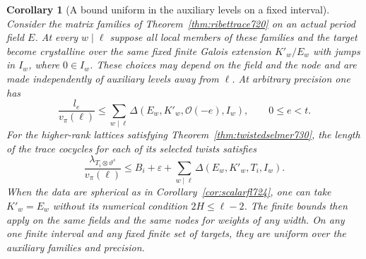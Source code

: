 \documentclass[a4paper,11pt]{article}
\newtheorem{corollary}[proposition]{Corollary}
\theoremstyle{definition}
\theoremstyle{remark}
\numberwithin{equation}{section}
\begin{document}
\begin{corollary}[A bound uniform in the auxiliary levels on a fixed interval]
\leavevmode\label{cor:fixedinterval732}
Consider the matrix families of Theorem~\ref{thm:ribettrace720}
on an actual period field \(E\). At every \(w\mid\ell\) suppose
all local members of these families and the target become crystalline
over the same fixed finite Galois extension \(K'_w/E_w\) with jumps in \(I_w\), where
\(0\in I_w\). These choices may depend on the field and the node
and are made independently of auxiliary levels away from \(\ell\).
At arbitrary precision one has
\[
    \frac{l_e}{v_\pi(\ell)}
         \le \sum_{w\mid\ell}
            \Delta(E_w,K'_w,\mathcal O(-e),I_w), \qquad 0\le e<t .
 \tag{3}\label{eq:scalarloss732}
\]
For the higher-rank lattices satisfying
Theorem~\ref{thm:twistedselmer730}, the length of the trace
cocycles for each of its selected twists satisfies
\[
    \frac{\lambda_{T_i\otimes\vartheta^s}}{v_\pi(\ell)}
        \le B_i+\varepsilon+
                 \sum_{w\mid\ell}\Delta(E_w,K'_w,T_i,I_w).
 \tag{4}\label{eq:mainloss732}
\]
When the data are spherical as in
Corollary~\ref{cor:scalarfl724}, one can take \(K'_w=E_w\) without
its numerical condition \(2H\le\ell-2\). The finite bounds then
apply on the same fields and the same nodes for weights of any
width. On any one finite interval and any fixed finite set of
targets, they are uniform over the auxiliary families and precision.
\end{corollary}
\end{document}
